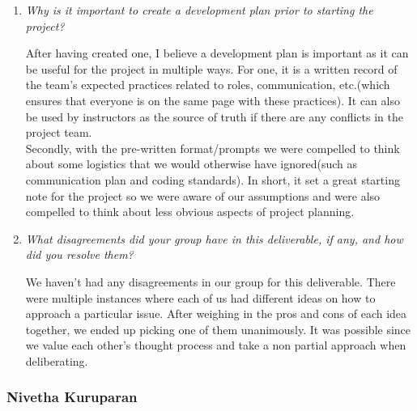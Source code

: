 \documentclass{article}
\begin{document}
\begin{enumerate}
  \item \textit{Why is it important to create a development plan prior to starting the project?}

   After having created one, I believe a development plan is important as it can be useful for the project in multiple ways. For one, it is a written record of the team's expected practices related to roles, communication, etc.(which ensures that everyone is on the same page with these practices). It can also be used by instructors as the source of truth if there are any conflicts in the project team.\\

   Secondly, with the pre-written format/prompts we were compelled to think about some logistics that we would otherwise have ignored(such as communication plan and coding standards). In short, it set a great starting note for the project so we were aware of our assumptions and were also compelled to think about less obvious aspects of project planning.

  \item \textit{What disagreements did your group have in this deliverable, if any, and how did you resolve them?}

  We haven’t had any disagreements in our group for this deliverable. There were multiple instances where each of us had different ideas on how to approach a particular issue. After weighing in the pros and cons of each idea together, we ended up picking one of them unanimously. It was possible since we value each other’s thought process and take a non partial approach when deliberating.

\end{enumerate}

\subsubsection*{Nivetha Kuruparan}
\end{document}
